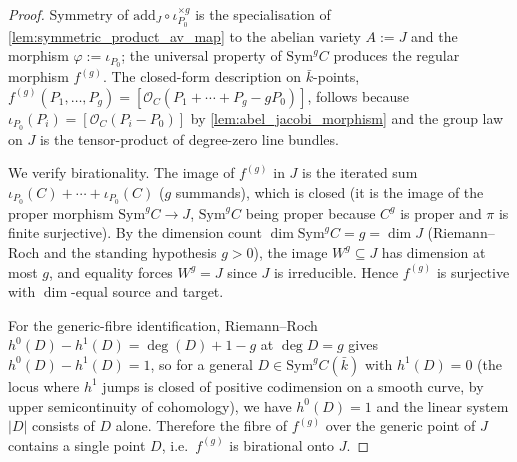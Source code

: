 
\begin{proof}

  Symmetry of \(\mathrm{add}_J \circ \iota_{P_0}^{\times g}\) is the
  specialisation of \cref{lem:symmetric_product_av_map} to the abelian
  variety \(A := J\) and the morphism \(\varphi := \iota_{P_0}\); the universal
  property of \(\mathrm{Sym}^g C\) produces the regular morphism \(f^{(g)}\).
  The closed-form description on \(\bar k\)-points,
  \(f^{(g)}(P_1, \ldots, P_g) = [\mathcal O_C(P_1 + \cdots + P_g - g P_0)]\),
  follows because \(\iota_{P_0}(P_i) = [\mathcal O_C(P_i - P_0)]\) by
  \cref{lem:abel_jacobi_morphism} and the group law on \(J\) is the
  tensor-product of degree-zero line bundles.

  We verify birationality. The image of \(f^{(g)}\) in \(J\) is the iterated
  sum \(\iota_{P_0}(C) + \cdots + \iota_{P_0}(C)\) (\(g\) summands), which is
  closed (it is the image of the proper morphism
  \(\mathrm{Sym}^g C \to J\), \(\mathrm{Sym}^g C\) being proper because \(C^g\)
  is proper and \(\pi\) is finite surjective). By the dimension count
  \(\dim \mathrm{Sym}^g C = g = \dim J\) (Riemann--Roch and the standing
  hypothesis \(g > 0\)), the image \(W^g \subseteq J\) has dimension at most
  \(g\), and equality forces \(W^g = J\) since \(J\) is irreducible. Hence
  \(f^{(g)}\) is surjective with \(\dim\)-equal source and target.

  For the generic-fibre identification, Riemann--Roch
  \(h^0(D) - h^1(D) = \deg(D) + 1 - g\) at \(\deg D = g\) gives \(h^0(D) - h^1(D)
  = 1\), so for a general \(D \in \mathrm{Sym}^g C(\bar k)\) with \(h^1(D) =
  0\) (the locus where \(h^1\) jumps is closed of positive codimension on a
  smooth curve, by upper semicontinuity of cohomology), we have \(h^0(D) =
  1\) and the linear system \(|D|\) consists of \(D\) alone. Therefore the
  fibre of \(f^{(g)}\) over the generic point of \(J\) contains a single point
  \(D\), i.e.\ \(f^{(g)}\) is birational onto \(J\).


\end{proof}
